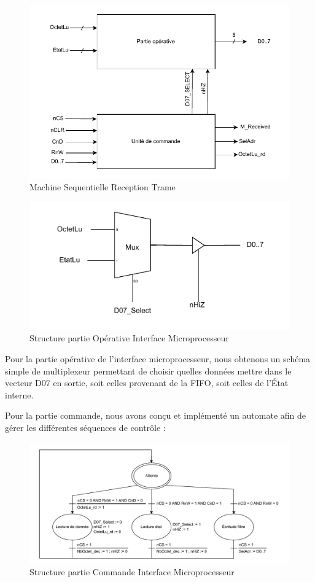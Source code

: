 \begin{figure}[H]
    \centering
    \includegraphics[width=0.8\linewidth]{images/inter/Machine_Seq_Interface_Micro.pdf}
    \caption{Machine Sequentielle Reception Trame}
    \label{fig:placeholder}
\end{figure}

\begin{figure}[H]
    \centering
    \includegraphics[width=0.8\linewidth]{images/inter/Structure_Interface_Micro.pdf}
    \caption{Structure partie Opérative Interface Microprocesseur}
    \label{fig:placeholder}
\end{figure}

Pour la partie opérative de l’interface microprocesseur, nous obtenons un schéma simple de multiplexeur permettant de choisir quelles données mettre dans le vecteur D07 en sortie, soit celles provenant de la FIFO, soit celles de l’État interne.
\newline

Pour la partie commande, nous avons conçu et implémenté un automate afin de gérer les différentes séquences de contrôle : 
\newline


\begin{figure}[H]
    \centering
    \includegraphics[width=0.8\linewidth]{images/inter/Automate_Interface_Micro.pdf}
    \caption{Structure partie Commande Interface Microprocesseur}
    \label{fig:placeholder}
\end{figure}

